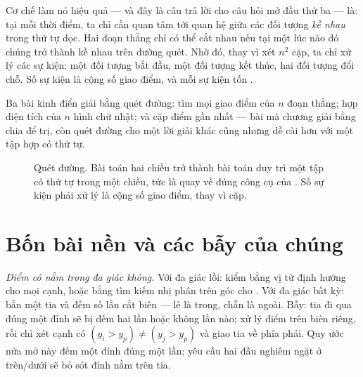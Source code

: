 \documentclass[../../algorithm.tex]{subfiles}
\begin{document}
Cơ chế làm nó hiệu quả --- và đây là câu trả lời cho câu hỏi mở đầu thứ ba --- là: tại mỗi thời điểm, ta chỉ cần quan tâm tới quan hệ giữa các đối tượng \emph{kề nhau} trong thứ tự dọc. Hai đoạn thẳng chỉ có thể cắt nhau nếu tại một lúc nào đó chúng trở thành kề nhau trên đường quét. Nhờ đó, thay vì xét \(n^2\) cặp, ta chỉ xử lý các sự kiện: một đối tượng bắt đầu, một đối tượng kết thúc, hai đối tượng đổi chỗ. Số sự kiện là  cộng số giao điểm, và mỗi sự kiện tốn .

Ba bài kinh điển giải bằng quét đường: tìm mọi giao điểm của \(n\) đoạn thẳng; hợp diện tích của \(n\) hình chữ nhật; và cặp điểm gần nhất --- bài mà chương  giải bằng chia để trị, còn quét đường cho một lời giải khác cũng  nhưng dễ cài hơn với một tập hợp có thứ tự.

\begin{figure}[H]\centering
{}
\caption{Quét đường. Bài toán hai chiều trở thành bài toán duy trì một tập có thứ tự trong một chiều, tức là quay về đúng công cụ của . Số sự kiện phải xử lý là  cộng số giao điểm, thay vì  cặp.}
\label{fig:sweep}
\end{figure}

\section{Bốn bài nền và các bẫy của chúng}

\emph{Điểm có nằm trong đa giác không.} Với đa giác lồi: kiểm bằng vị từ định hướng cho mọi cạnh, hoặc bằng tìm kiếm nhị phân trên góc cho . Với đa giác bất kỳ: bắn một tia và đếm số lần cắt biên --- lẻ là trong, chẵn là ngoài. Bẫy: tia đi qua đúng một đỉnh sẽ bị đếm hai lần hoặc không lần nào; xử lý điểm trên biên riêng, rồi chỉ xét cạnh có \((y_i>y_p)\ne(y_j>y_p)\) và giao tia về phía phải. Quy ước nửa mở này đếm một đỉnh đúng một lần; yêu cầu hai đầu nghiêm ngặt ở trên/dưới sẽ bỏ sót đỉnh nằm trên tia.
\end{document}
